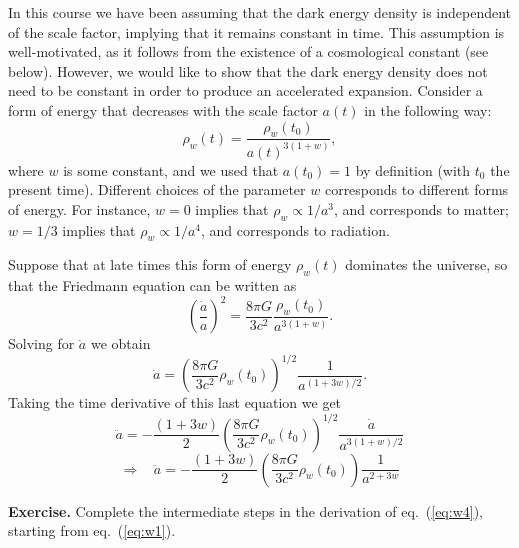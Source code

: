 In this course we have been assuming that the dark energy density is independent of the scale factor, implying that it remains constant in time. This assumption is well-motivated, as it follows from the existence of a cosmological constant (see below). However, we would like to show that the dark energy density does not need to be constant in order to produce an accelerated expansion. Consider a form of energy that decreases with the scale factor $a(t)$ in the following way:
\begin{equation} \label{eq:w0}
\rho_w(t)=\frac{\rho_w(t_0)}{a(t)^{3(1+w)}},
\end{equation}
where $w$ is some constant, and we used that $a(t_0)=1$ by definition (with $t_0$ the present time). Different choices of the parameter $w$ corresponds to different forms of energy. For instance, $w=0$ implies that $\rho_w\propto 1/a^3$, and corresponds to matter; $w=1/3$ implies that $\rho_w\propto 1/a^4$, and corresponds to radiation.

Suppose that at late times this form of energy $\rho_w(t)$ dominates the universe, so that the Friedmann equation can be written as
\begin{equation} \label{eq:w1}
\left(\frac{\dot{a}}{a}\right)^2= \frac{8\pi G}{3c^2}\frac{\rho_w(t_0)}{a^{3(1+w)}}.
\end{equation}
Solving for $\dot{a}$ we obtain
\begin{equation} \label{eq:w2}
\dot{a}=\left(\frac{8\pi G}{3c^2}\rho_w(t_0)\right)^{1/2} \frac{1}{a^{(1+3w)/2}}.
\end{equation}
Taking the time derivative of this last equation we get
\begin{equation} \label{eq:w3}
\ddot{a}=-\frac{(1+3w)}{2}\left(\frac{8\pi G}{3c^2}\rho_w(t_0)\right)^{1/2} \frac{\dot{a}}{a^{3(1+w)/2}}
\end{equation}
\begin{equation} \label{eq:w4}
\Rightarrow~~~~ \ddot{a}=-\frac{(1+3w)}{2}\left(\frac{8\pi G}{3c^2}\rho_w(t_0)\right) \frac{1}{a^{2+3w}}
\end{equation}

\par\vspace{\baselineskip}

{\bf Exercise.} Complete the intermediate steps in the derivation of eq.\ (\ref{eq:w4}), starting from eq.\ (\ref{eq:w1}).

\par\vspace{\baselineskip}


